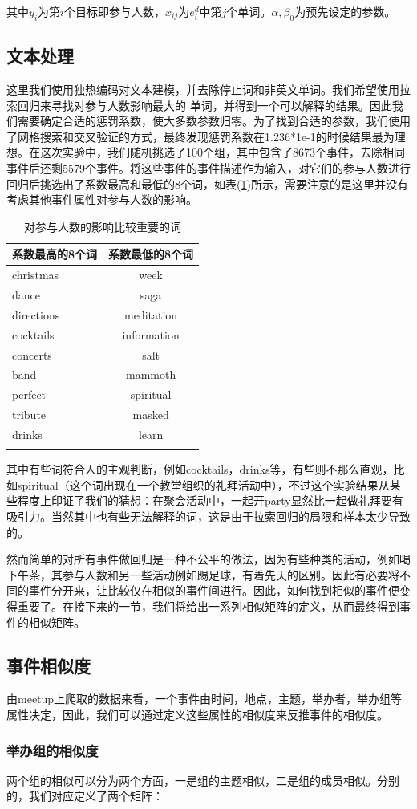 \documentclass[12pt]{template}
\begin{document}
其中\(y_i\)为第\(i\)个目标即参与人数，\(x_{ij}\)为\(e_i^d\)中第\(j\)个单词。\(\alpha,\beta_0\)为预先设定的参数。
\subsection{文本处理}\label{3.2}

这里我们使用独热编码对文本建模，并去除停止词和非英文单词。我们希望使用拉索回归来寻找对参与人数影响最大的
单词，并得到一个可以解释的结果。因此我们需要确定合适的惩罚系数，使大多数参数归零。为了找到合适的参数，我们使用了网格搜索和交叉验证的方式，最终发现惩罚系数在1.236*1e-1的时候结果最为理想。在这次实验中，我们随机挑选了100个组，其中包含了8673个事件，去除相同事件后还剩5579个事件。将这些事件的事件描述作为输入，对它们的参与人数进行回归后挑选出了系数最高和最低的8个词，如表(\ref{t2})所示，需要注意的是这里并没有考虑其他事件属性对参与人数的影响。

\begin{longtable}[HTBP]{@{}lc@{}}
\toprule
系数最高的8个词 & 系数最低的8个词\tabularnewline
\midrule
\endhead
christmas & week\tabularnewline
dance & saga\tabularnewline
directions & meditation\tabularnewline
cocktails & information\tabularnewline
concerts & salt\tabularnewline
band & mammoth\tabularnewline
perfect & spiritual\tabularnewline
tribute & masked\tabularnewline
drinks & learn\tabularnewline
\bottomrule
\label{t2}
\caption{对参与人数的影响比较重要的词}
\end{longtable}
  
其中有些词符合人的主观判断，例如cocktails，drinks等，有些则不那么直观，比如spiritual（这个词出现在一个教堂组织的礼拜活动中），不过这个实验结果从某些程度上印证了我们的猜想：在聚会活动中，一起开party显然比一起做礼拜要有吸引力。当然其中也有些无法解释的词，这是由于拉索回归的局限和样本太少导致的。

然而简单的对所有事件做回归是一种不公平的做法，因为有些种类的活动，例如喝下午茶，其参与人数和另一些活动例如踢足球，有着先天的区别。因此有必要将不同的事件分开来，让比较仅在相似的事件间进行。因此，如何找到相似的事件便变得重要了。在接下来的一节，我们将给出一系列相似矩阵的定义，从而最终得到事件的相似矩阵。

\subsection{事件相似度}
由meetup上爬取的数据来看，一个事件由时间，地点，主题，举办者，举办组等属性决定，因此，我们可以通过定义这些属性的相似度来反推事件的相似度。

\subsubsection{举办组的相似度}
两个组的相似可以分为两个方面，一是组的主题相似，二是组的成员相似。分别的，我们对应定义了两个矩阵：
\end{document}
